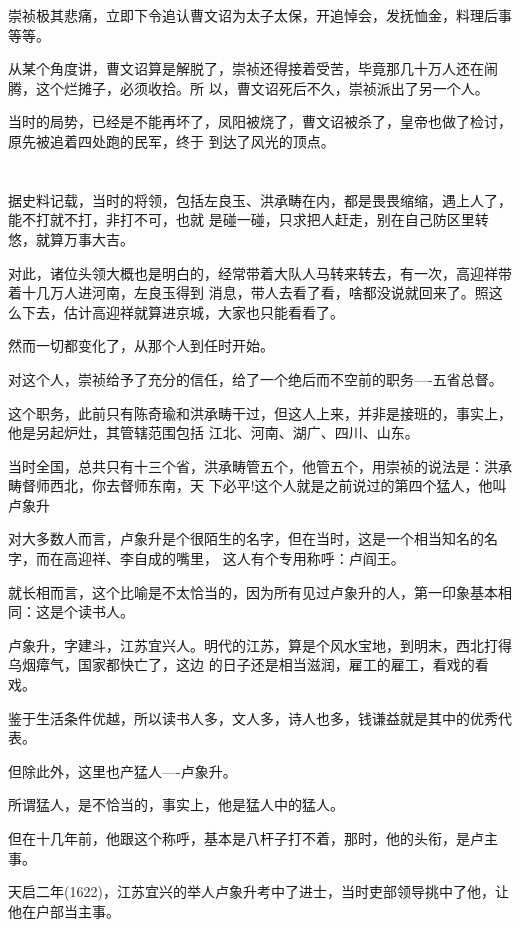 \documentclass[11pt,a4paper,onecolumn]{article}
\begin{document}
崇祯极其悲痛，立即下令追认曹文诏为太子太保，开追悼会，发抚恤金，料理后事等等。

从某个角度讲，曹文诏算是解脱了，崇祯还得接着受苦，毕竟那几十万人还在闹腾，这个烂摊子，必须收拾。所
以，曹文诏死后不久，崇祯派出了另一个人。

当时的局势，已经是不能再坏了，凤阳被烧了，曹文诏被杀了，皇帝也做了检讨，原先被追着四处跑的民军，终于
到达了风光的顶点。

\section[\thesection]{}

据史料记载，当时的将领，包括左良玉、洪承畴在内，都是畏畏缩缩，遇上人了，能不打就不打，非打不可，也就
是碰一碰，只求把人赶走，别在自己防区里转悠，就算万事大吉。

对此，诸位头领大概也是明白的，经常带着大队人马转来转去，有一次，高迎祥带着十几万人进河南，左良玉得到
消息，带人去看了看，啥都没说就回来了。照这么下去，估计高迎祥就算进京城，大家也只能看看了。

然而一切都变化了，从那个人到任时开始。

对这个人，崇祯给予了充分的信任，给了一个绝后而不空前的职务----五省总督。

这个职务，此前只有陈奇瑜和洪承畴干过，但这人上来，并非是接班的，事实上，他是另起炉灶，其管辖范围包括
江北、河南、湖广、四川、山东。

当时全国，总共只有十三个省，洪承畴管五个，他管五个，用崇祯的说法是：洪承畴督师西北，你去督师东南，天
下必平!这个人就是之前说过的第四个猛人，他叫卢象升

对大多数人而言，卢象升是个很陌生的名字，但在当时，这是一个相当知名的名字，而在高迎祥、李自成的嘴里，
这人有个专用称呼：卢阎王。

就长相而言，这个比喻是不太恰当的，因为所有见过卢象升的人，第一印象基本相同：这是个读书人。

卢象升，字建斗，江苏宜兴人。明代的江苏，算是个风水宝地，到明末，西北打得乌烟瘴气，国家都快亡了，这边
的日子还是相当滋润，雇工的雇工，看戏的看戏。

鉴于生活条件优越，所以读书人多，文人多，诗人也多，钱谦益就是其中的优秀代表。

但除此外，这里也产猛人----卢象升。

所谓猛人，是不恰当的，事实上，他是猛人中的猛人。

但在十几年前，他跟这个称呼，基本是八杆子打不着，那时，他的头衔，是卢主事。

天启二年(1622)，江苏宜兴的举人卢象升考中了进士，当时吏部领导挑中了他，让他在户部当主事。
\end{document}
